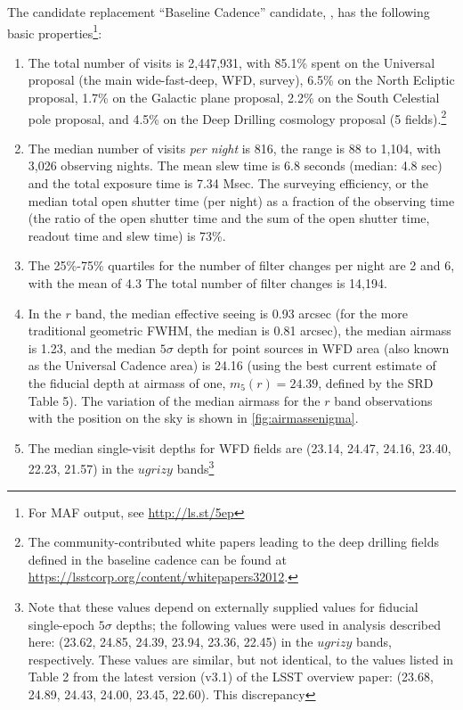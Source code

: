 The candidate replacement ``Baseline Cadence'' candidate,
, has the following basic
properties\footnote{For MAF output, see \url{http://ls.st/5ep}}:
\begin{enumerate}
\item The total number of visits is 2,447,931, with 85.1\% spent on
the Universal proposal (the main wide-fast-deep, WFD, survey), 6.5\% on the
North Ecliptic proposal, 1.7\% on the Galactic plane proposal, 2.2\%
on the South Celestial pole proposal, and 4.5\% on the Deep Drilling
cosmology proposal (5 fields).\footnote{The community-contributed white papers leading to the
deep drilling fields defined in the baseline cadence can be found at
\url{https://lsstcorp.org/content/whitepapers32012}.}
\item The median number of visits {\it per night} is 816, the range is
88 to 1,104, with 3,026 observing nights. The mean slew time is 6.8
seconds (median: 4.8 sec) and the total exposure time is 7.34 Msec.
The surveying efficiency, or the median total open shutter time (per night)
as a fraction of the observing time (the ratio of the open shutter time and
the sum of the open shutter time, readout time and slew time) is 73\%.
\item
The 25\%-75\% quartiles for the number of filter changes per night are 2
and 6, with the mean of 4.3 The total number of filter changes is 14,194.
\item In the $r$ band, the median effective seeing is 0.93 arcsec (for the more
traditional geometric FWHM, the median is 0.81 arcsec), the median
airmass is 1.23, and the median $5\sigma$ depth for point sources in WFD
area (also known as the Universal Cadence area) is 24.16 (using the best
current estimate of the fiducial depth at airmass of one, $m_5(r)=24.39$,
defined by the SRD Table 5). The variation of the median airmass for the $r$
band observations with the position on the sky is shown in
\autoref{fig:airmassenigma}.
\item The median single-visit depths for WFD fields are (23.14, 24.47, 24.16,
23.40, 22.23, 21.57) in the $ugrizy$ bands\footnote{Note that these values
depend on externally supplied values for fiducial single-epoch
$5\sigma$ depths; the following values were used in analysis described
here: (23.62, 24.85, 24.39, 23.94, 23.36, 22.45) in the $ugrizy$
bands, respectively. These values are similar, but not identical, to the values
listed in Table 2 from the latest version (v3.1) of the LSST overview
paper: (23.68, 24.89, 24.43, 24.00, 23.45, 22.60). This discrepancy
}
\end{enumerate}
